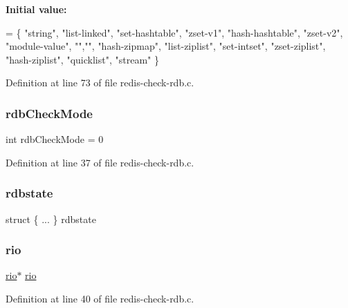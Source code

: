{\bfseries Initial value\+:}
\begin{DoxyCode}
= \{
    \textcolor{stringliteral}{"string"},
    \textcolor{stringliteral}{"list-linked"},
    \textcolor{stringliteral}{"set-hashtable"},
    \textcolor{stringliteral}{"zset-v1"},
    \textcolor{stringliteral}{"hash-hashtable"},
    \textcolor{stringliteral}{"zset-v2"},
    \textcolor{stringliteral}{"module-value"},
    \textcolor{stringliteral}{""},\textcolor{stringliteral}{""},
    \textcolor{stringliteral}{"hash-zipmap"},
    \textcolor{stringliteral}{"list-ziplist"},
    \textcolor{stringliteral}{"set-intset"},
    \textcolor{stringliteral}{"zset-ziplist"},
    \textcolor{stringliteral}{"hash-ziplist"},
    \textcolor{stringliteral}{"quicklist"},
    \textcolor{stringliteral}{"stream"}
\}
\end{DoxyCode}


Definition at line 73 of file redis-\/check-\/rdb.\+c.

\mbox{\label{redis-check-rdb_8c_aefef68276e4a8d9a17eb4850e4e8dc21}} 
\subsubsection{\texorpdfstring{rdb\+Check\+Mode}{rdbCheckMode}}
{\footnotesize\ttfamily int rdb\+Check\+Mode = 0}



Definition at line 37 of file redis-\/check-\/rdb.\+c.

\mbox{\label{redis-check-rdb_8c_a87cbfd83b26a69e12e621ca97b2155f8}} 
\subsubsection{\texorpdfstring{rdbstate}{rdbstate}}
{\footnotesize\ttfamily struct \{ ... \}   rdbstate}

\mbox{\label{redis-check-rdb_8c_a9f62ec81cd12b2b2e4faebe457b15440}} 
\subsubsection{\texorpdfstring{rio}{rio}}
{\footnotesize\ttfamily \hyperlink{rio_8h_a048ce06d2f559006ef67f885ceb2c1ca}{rio}$\ast$ \hyperlink{rio_8h_a048ce06d2f559006ef67f885ceb2c1ca}{rio}}



Definition at line 40 of file redis-\/check-\/rdb.\+c.

